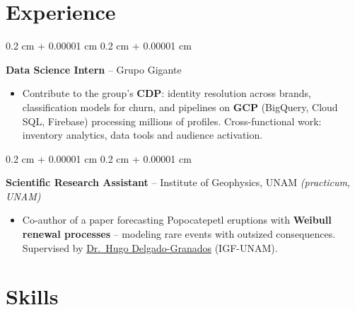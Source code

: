 \documentclass[10pt, letterpaper]{article}
\newenvironment{highlights}{
    \begin{itemize}[
        topsep=0 cm,
        parsep=0.02 cm,
        partopsep=0pt,
        itemsep=0pt,
        leftmargin=0.4 cm + 10pt
    ]
}{
    \end{itemize}
}
\newenvironment{onecolentry}{
    \begin{adjustwidth}{
        0.2 cm + 0.00001 cm
    }{
        0.2 cm + 0.00001 cm
    }
}{
    \end{adjustwidth}
}
\let\hrefWithoutArrow\href
\renewcommand{\href}[2]{\hrefWithoutArrow{#1}{\ifthenelse{\equal{#2}{}}{ }{#2 }\raisebox{.15ex}{\footnotesize \faExternalLink*}}}
\begin{document}
    \section{Experience}

        \begin{onecolentry}
            \textbf{Data Science Intern} -- Grupo Gigante
            \begin{highlights}
                \item Contribute to the group's \textbf{CDP}: identity resolution across brands, classification models for churn, and pipelines on \textbf{GCP} (BigQuery, Cloud SQL, Firebase) processing millions of profiles. Cross-functional work: inventory analytics, data tools and audience activation.
            \end{highlights}
            \end{onecolentry}

        \vspace{0.02 cm}

        \begin{onecolentry}
            \textbf{Scientific Research Assistant} -- Institute of Geophysics, UNAM \textit{(practicum, UNAM)}
            \begin{highlights}
                \item Co-author of a paper forecasting Popocatepetl eruptions with \textbf{Weibull renewal processes} -- modeling rare events with outsized consequences. Supervised by \hrefWithoutArrow{https://scholar.google.com/citations?user=lDD0DZQAAAAJ}{Dr.\ Hugo Delgado-Granados} (IGF-UNAM).
            \end{highlights}
            \end{onecolentry}


    \section{Skills}
\end{document}
